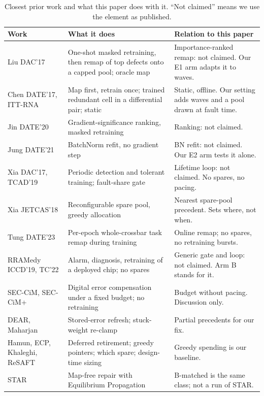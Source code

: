 \documentclass[journal]{IEEEtran}
\begin{document}
\begin{table}[t]
\centering
\caption{Closest prior work and what this paper does with it. ``Not claimed'' means we use the element as published.}
\label{tab:positioning}
\small
\begin{tabular}{p{2.6cm}p{5.6cm}p{7.6cm}}
\toprule
Work & What it does & Relation to this paper \\
\midrule
Liu DAC'17 \cite{liu17dac} & One-shot masked retraining, then remap of top defects onto a capped pool; oracle map & Importance-ranked remap: not claimed. Our E1 arm adapts it to waves. \\
Chen DATE'17, ITT-RNA \cite{chen17date,song21ittrna} & Map first, retrain once; trained redundant cell in a differential pair; static & Static, offline. Our setting adds waves and a pool drawn at fault time. \\
Jin DATE'20 \cite{jin20date} & Gradient-significance ranking, masked retraining & Ranking: not claimed. \\
Jung DATE'21 \cite{jung21date} & BatchNorm refit, no gradient step & BN refit: not claimed. Our E2 arm tests it alone. \\
Xia DAC'17, TCAD'19 \cite{xia17dac,xia19tcad} & Periodic detection and tolerant training; fault-share gate & Lifetime loop: not claimed. No spares, no pacing. \\
Xia JETCAS'18 \cite{xia18jetcas} & Reconfigurable spare pool, greedy allocation & Nearest spare-pool precedent. Sets where, not when. \\
Tung DATE'23 \cite{tung23date} & Per-epoch whole-crossbar task remap during training & Online remap; no spares, no retraining bursts. \\
RRAMedy ICCD'19, TC'22 \cite{li19rramedy,li22tc} & Alarm, diagnosis, retraining of a deployed chip; no spares & Generic gate and loop: not claimed. Arm B stands for it. \\
SEC-CiM, SEC-CiM+ \cite{bommana24itc,bommana26todaes} & Digital error compensation under a fixed budget; no retraining & Budget without pacing. Discussion only. \\
DEAR, Maharjan \cite{bommana25dear,maharjan26isqed} & Stored-error refresh; stuck-weight re-clamp & Partial precedents for our fix. \\
Hamun, ECP, Khaleghi, ReSAFT \cite{sabri25hamun,schechter10ecp,khaleghi18,dorostkar26resaft} & Deferred retirement; greedy pointers; which spare; design-time sizing & Greedy spending is our baseline. \\
STAR \cite{khan26star} & Map-free repair with Equilibrium Propagation & B-matched is the same class; not a run of STAR. \\
\bottomrule
\end{tabular}
\end{table}
\end{document}
